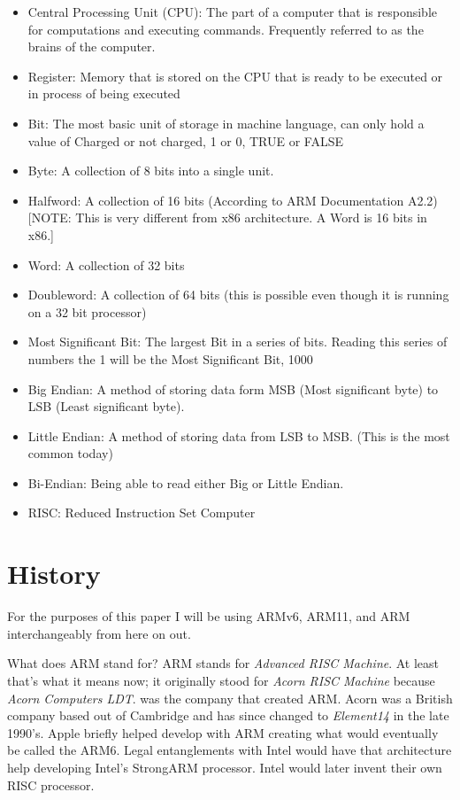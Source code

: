 \documentclass[twoside]{article}
\begin{document}
	\begin{itemize}
		\item Central Processing Unit (CPU):
		The part of a computer that is responsible for computations and executing commands. Frequently referred to as the brains of the computer.
		\item Register:
		Memory that is stored on the CPU that is ready to be executed or in process of being executed
		\item Bit:
		The most basic unit of storage in machine language, can only hold a value of Charged or not charged, 1 or 0, TRUE or FALSE
		\item Byte:
		A collection of 8 bits into a single unit.
		\item Halfword:
		A collection of 16 bits (According to ARM Documentation A2.2)  
		[NOTE: This is very different from x86 architecture. A Word is 16 bits in x86.]
		\item Word:
		A collection of 32 bits
		\item Doubleword:
		A collection of 64 bits (this is possible even though it is running on a 32 bit processor)
		\item Most Significant Bit:
		The largest Bit in a series of bits.  
		Reading this series of numbers the 1 will be the Most Significant Bit, 1000
		\item Big Endian:
		A method of storing data form MSB (Most significant byte) to LSB (Least significant byte).  
		\item Little Endian:
		A method of storing data from LSB to MSB. (This is the most common today)
		\item Bi-Endian:
		Being able to read either Big or Little Endian. 
		\item RISC:
		Reduced Instruction Set Computer
		
	\end{itemize}
	
	\section{History}
	
	\noindent \tiny{For the purposes of this paper I will be using ARMv6, ARM11, and ARM interchangeably from here on out.}
	
	\noindent \normalsize{What does ARM stand for?
	ARM stands for \textit{Advanced RISC Machine}. At least that's what it means now; it originally stood for \textit{Acorn RISC Machine} because \textit{Acorn Computers LDT}. was the company that created ARM. Acorn was a British company based out of Cambridge and has since changed to \textit{Element14} in the late 1990's.  
	Apple briefly helped develop with ARM creating what would eventually be called the ARM6. Legal entanglements with Intel would have that architecture help developing Intel's StrongARM processor. Intel would later invent their own RISC processor.}
\end{document}

